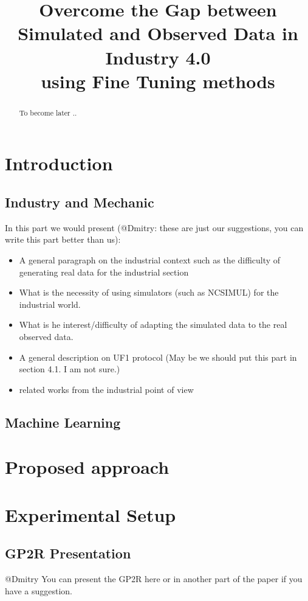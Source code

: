 \documentclass{article}
\title{Overcome the Gap between Simulated and Observed Data in Industry 4.0\\ using Fine Tuning methods}
\begin{document}
\maketitle

\begin{abstract}
To become later ..
\end{abstract}

\section{Introduction}

\subsection{Industry and Mechanic}
In this part we would present (@Dmitry: these are just our suggestions, you can write this part better than us):
\begin{itemize}
\item A general paragraph on the industrial context such as the difficulty of generating real data for the industrial section
\item What is the necessity of using simulators (such as NCSIMUL) for the industrial world. 
\item What is he interest/difficulty of adapting the simulated data to the real observed data.
\item A general description on UF1 protocol (May be we should put this part in section 4.1. I am not sure.)
\item related works from the industrial point of view
\end{itemize}
 
\subsection{Machine Learning}


\section{Proposed approach}


\section{Experimental Setup}
\subsection{GP2R Presentation}
@Dmitry You can present the GP2R here or in another part of the paper if you have a suggestion.
\end{document}

